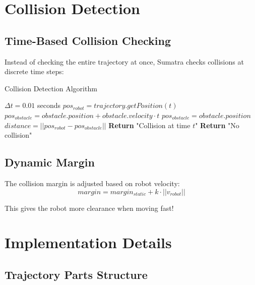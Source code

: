 \documentclass[12pt,a4paper]{article}
\begin{document}
\section{Collision Detection}

\subsection{Time-Based Collision Checking}

Instead of checking the entire trajectory at once, Sumatra checks collisions at discrete time steps:

\begin{algorithm}
\caption{Collision Detection Algorithm}
\begin{algorithmic}
\STATE $\Delta t = 0.01$ seconds 
    \STATE $pos_{robot} = trajectory.getPosition(t)$
            \STATE $pos_{obstacle} = obstacle.position + obstacle.velocity \cdot t$
        \ELSE
            \STATE $pos_{obstacle} = obstacle.position$
        \ENDIF
        \STATE $distance = ||pos_{robot} - pos_{obstacle}||$
            \STATE \textbf{Return} "Collision at time $t$"
        \ENDIF
    \ENDFOR
\ENDFOR
\STATE \textbf{Return} "No collision"
\end{algorithmic}
\end{algorithm}

\subsection{Dynamic Margin}

The collision margin is adjusted based on robot velocity:
\begin{equation}
    margin = margin_{static} + k \cdot ||v_{robot}||
\end{equation}

This gives the robot more clearance when moving fast!

\section{Implementation Details}

\subsection{Trajectory Parts Structure}
\end{document}
